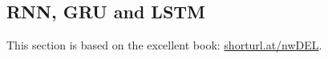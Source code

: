 \subsection{RNN, GRU and LSTM}
This section is based on the excellent book: \url{shorturl.at/nwDEL}.
